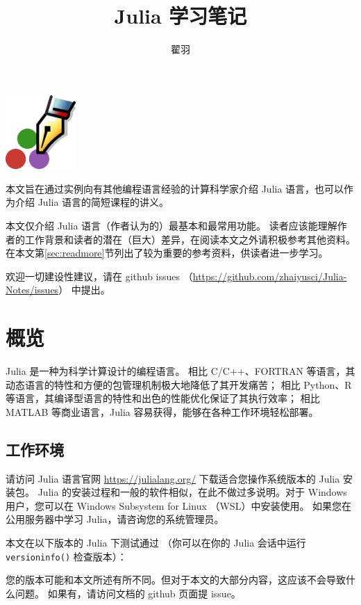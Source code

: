 \documentclass[10pt,a4paper]{article}
\begin{document}
\title{Julia 学习笔记}
\author{翟羽}
\maketitle

{\centering
\includegraphics[width=0.2\textwidth]{pen.png}

}

\begin{multicols}{2}
	\tableofcontents
\end{multicols}



本文旨在通过实例向有其他编程语言经验的计算科学家介绍 Julia 语言，也可以作为介绍 Julia 语言的简短课程的讲义。

本文仅介绍 Julia 语言（作者认为的）最基本和最常用功能。
读者应该能理解作者的工作背景和读者的潜在（巨大）差异，在阅读本文之外请积极参考其他资料。
在本文第\ref{sec:readmore}节列出了较为重要的参考资料，供读者进一步学习。

欢迎一切建设性建议，请在 github issues （\url{https://github.com/zhaiyusci/Julia-Notes/issues}）  中提出。


\section{概览}

Julia 是一种为科学计算设计的编程语言。
相比 C/C++、FORTRAN 等语言，其动态语言的特性和方便的包管理机制极大地降低了其开发痛苦；
相比 Python、R 等语言，其编译型语言的特性和出色的性能优化保证了其执行效率；
相比 MATLAB 等商业语言，Julia 容易获得，能够在各种工作环境轻松部署。

\subsection{工作环境}

请访问 Julia 语言官网 \url{https://julialang.org/} 下载适合您操作系统版本的 Julia 安装包。
Julia 的安装过程和一般的软件相似，在此不做过多说明。对于 Windows 用户，您可以在 Windows Subsystem for Linux （WSL）中安装使用。
如果您在公用服务器中学习 Julia，请咨询您的系统管理员。

本文在以下版本的 Julia 下测试通过
（你可以在你的 Julia 会话中运行 \lstinline|versioninfo()| 检查版本）：

您的版本可能和本文所述有所不同。但对于本文的大部分内容，这应该不会导致什么问题。
如果有，请访问文档的 github 页面提 issue。
\end{document}
